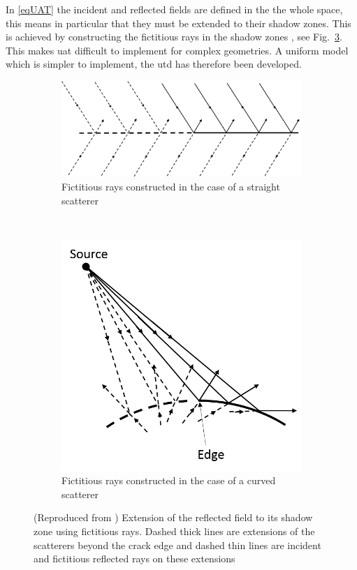 In \eqref{eqUAT} the incident and reflected fields are defined in the the whole space, this means in particular that they must be extended to their shadow zones. This is achieved by constructing the fictitious rays in the shadow zones \cite{Bouche,Molinet}, see Fig.~\ref{FictRays}. This makes \acrshort{uat} difficult to implement for complex geometries. A uniform model which is simpler to implement, the \acrfull{utd} has therefore been developed.

\begin{figure}[h]
    \centering
    \begin{subfigure}[b]{0.45\textwidth}
        \includegraphics[width=\textwidth]{images/chapter1/FictitiousStraight.png}
        \caption{Fictitious rays constructed in the case of a straight scatterer}
        \label{Straightfict}
    \end{subfigure}
    ~ 
    \begin{subfigure}[b]{0.45\textwidth}
        \includegraphics[width=\textwidth]{images/chapter1/FictitiousCurved.png}
        \caption{Fictitious rays constructed in the case of a curved scatterer}
        \label{Curvedfict}
    \end{subfigure}
    \caption{(Reproduced from \cite{Bouche,Molinet}) Extension of the reflected field to its shadow zone using fictitious rays. Dashed thick lines are extensions of the scatterers beyond the crack edge and dashed thin lines are incident and fictitious reflected rays on these extensions}
    \label{FictRays}
\end{figure}

